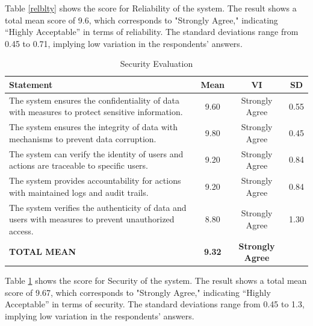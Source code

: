 \documentclass[12pt,a4paper,]{article}
\begin{document}
	Table \ref{relblty} shows the score for Reliability of the system. The result shows a total mean score of 9.6, which corresponds to "Strongly Agree," indicating “Highly Acceptable” in terms of reliability. The standard deviations range from 0.45 to 0.71, implying low variation in the respondents’ answers.
	
	\begin{table}[h!]
		\centering
		\caption{Security Evaluation}
		\label{secrty}
		\renewcommand{\arraystretch}{1.2}
		\begin{tabularx}{\linewidth}{|X|c|c|c|}
			\hline
			\textbf{Statement} & \textbf{Mean} & \textbf{VI} & \textbf{SD} \\ \hline
			The system ensures the confidentiality of data with measures to protect sensitive information.
			& 9.60 & Strongly Agree & 0.55 \\ \hline
			The system ensures the integrity of data with mechanisms to prevent data corruption.
			& 9.80 & Strongly Agree & 0.45 \\ \hline
			The system can verify the identity of users and actions are traceable to specific users.
			& 9.20 & Strongly Agree & 0.84 \\ \hline
			The system provides accountability for actions with maintained logs and audit trails.
			& 9.20 & Strongly Agree & 0.84 \\ \hline
			The system verifies the authenticity of data and users with measures to prevent unauthorized access.
			& 8.80 & Strongly Agree & 1.30 \\ \hline
			\textbf{TOTAL MEAN} & \textbf{9.32} & \textbf{Strongly Agree} & \\ \hline
		\end{tabularx}
	\end{table}
	
	Table \ref{secrty} shows the score for Security of the system. The result shows a total mean score of 9.67, which corresponds to "Strongly Agree," indicating “Highly Acceptable” in terms of security. The standard deviations range from 0.45 to 1.3, implying low variation in the respondents’ answers.
	
\end{document}
